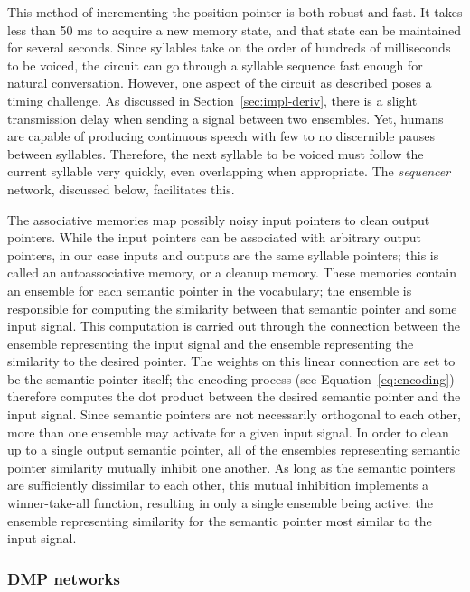 This method of incrementing the position pointer
is both robust and fast.
It takes less than 50 ms to acquire
a new memory state,
and that state can be maintained
for several seconds.
Since syllables take
on the order of hundreds of milliseconds
to be voiced,
the circuit can go through a syllable sequence
fast enough for natural conversation.
However, one aspect of the circuit as described
poses a timing challenge.
As discussed in Section~\ref{sec:impl-deriv},
there is a slight transmission delay
when sending a signal between two ensembles.
Yet, humans are capable of producing
continuous speech with
few to no discernible pauses between syllables.
Therefore, the next syllable to be voiced
must follow the current syllable very quickly,
even overlapping when appropriate.
The \textit{sequencer} network,
discussed below, facilitates this.

The associative memories
map possibly noisy input pointers
to clean output pointers.
While the input pointers
can be associated with arbitrary
output pointers,
in our case inputs and outputs
are the same syllable pointers;
this is called an autoassociative memory,
or a cleanup memory.
These memories contain an ensemble
for each semantic pointer
in the vocabulary;
the ensemble is responsible for computing
the similarity between
that semantic pointer
and some input signal.
This computation is carried out
through the connection between
the ensemble representing the input signal
and the ensemble representing
the similarity to the desired pointer.
The weights on this linear connection
are set to be the semantic pointer itself;
the encoding process (see Equation~\eqref{eq:encoding})
therefore computes the dot product
between the desired semantic pointer
and the input signal.
Since semantic pointers are not necessarily
orthogonal to each other,
more than one ensemble may activate
for a given input signal.
In order to clean up to a single
output semantic pointer,
all of the ensembles
representing semantic pointer similarity
mutually inhibit one another.
As long as the semantic pointers
are sufficiently dissimilar
to each other,
this mutual inhibition
implements a winner-take-all function,
resulting in only a single ensemble
being active: the ensemble
representing similarity for the
semantic pointer most similar to the input signal.

\subsubsection{DMP networks}
\label{sec:impl-dmp}

